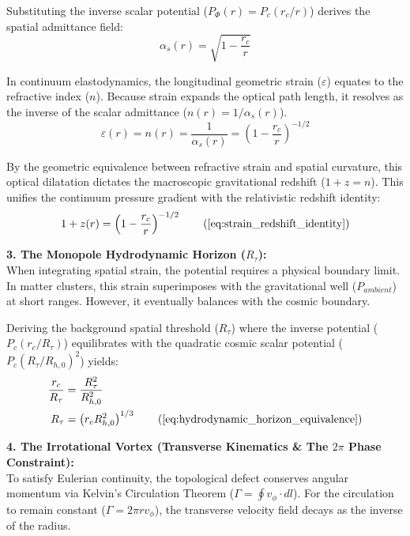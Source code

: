Substituting the inverse scalar potential ($P_\Phi(r) = P_c(r_c/r)$) derives the spatial admittance field:
\begin{equation}
    \alpha_s(r) = \sqrt{1 - \frac{r_c}{r}}
\end{equation}

In continuum elastodynamics, the longitudinal geometric strain ($\varepsilon$) equates to the refractive index ($n$). Because strain expands the optical path length, it resolves as the inverse of the scalar admittance ($n(r) = 1/\alpha_s(r)$). 
\begin{equation}
    \varepsilon(r) = n(r) = \frac{1}{\alpha_s(r)} = \left( 1 - \frac{r_c}{r} \right)^{-1/2}
\end{equation}

By the geometric equivalence between refractive strain and spatial curvature, this optical dilatation dictates the macroscopic gravitational redshift ($1+z = n$). This unifies the continuum pressure gradient with the relativistic redshift identity:
\begin{equation}
    1+z(r) = \left( 1 - \frac{r_c}{r} \right)^{-1/2} \tag{\ref{eq:strain_redshift_identity}}
\end{equation}

\textbf{3. The Monopole Hydrodynamic Horizon ($R_\tau$):} \\
When integrating spatial strain, the potential requires a physical boundary limit. In matter clusters, this strain superimposes with the gravitational well ($P_{ambient}$) at short ranges. However, it eventually balances with the cosmic boundary. 

Deriving the background spatial threshold ($R_\tau$) where the inverse potential ($P_c(r_c/R_\tau)$) equilibrates with the quadratic cosmic scalar potential ($P_c(R_\tau/R_{h,0})^2$) yields: 
\begin{align}
    \frac{r_c}{R_\tau} &= \frac{R_\tau^2}{R_{h,0}^2} \nonumber \\
    R_\tau &= \left( r_c R_{h,0}^2 \right)^{1/3} \tag{\ref{eq:hydrodynamic_horizon_equivalence}}
\end{align}

\vspace{0.2 cm}

\textbf{4. The Irrotational Vortex (Transverse Kinematics \& The $2\pi$ Phase Constraint):} \\
To satisfy Eulerian continuity, the topological defect conserves angular momentum via Kelvin's Circulation Theorem ($\Gamma = \oint v_\phi \cdot dl$). For the circulation to remain constant ($\Gamma = 2\pi r v_\phi$), the transverse velocity field decays as the inverse of the radius. 

